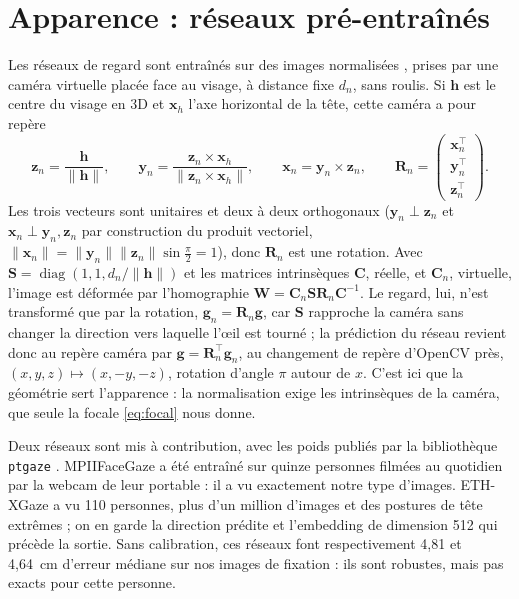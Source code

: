 \documentclass[10pt,a4paper]{article}
\newcommand{\vect}[1]{\symbf{#1}}
\newcommand{\T}{^{\top}}
\begin{document}
\section{Apparence : réseaux pré-entraînés}\label{sec:app}

Les réseaux de regard sont entraînés sur des images normalisées \cite{zhang2018revisiting}, prises par une caméra virtuelle placée face au visage, à distance fixe $d_n$, sans roulis. Si $\vect h$ est le centre du visage en 3D et $\vect x_h$ l'axe horizontal de la tête, cette caméra a pour repère
\begin{equation}
\vect z_n=\frac{\vect h}{\|\vect h\|},\qquad
\vect y_n=\frac{\vect z_n\times\vect x_h}{\|\vect z_n\times\vect x_h\|},\qquad
\vect x_n=\vect y_n\times\vect z_n,\qquad
\mathbf R_n=\begin{pmatrix}\vect x_n\T\\ \vect y_n\T\\ \vect z_n\T\end{pmatrix}.
\end{equation}
Les trois vecteurs sont unitaires et deux à deux orthogonaux ($\vect y_n\perp\vect z_n$ et $\vect x_n\perp\vect y_n,\vect z_n$ par construction du produit vectoriel, $\|\vect x_n\|=\|\vect y_n\|\|\vect z_n\|\sin\frac\pi2=1$), donc $\mathbf R_n$ est une rotation. Avec $\mathbf S=\operatorname{diag}(1,1,d_n/\|\vect h\|)$ et les matrices intrinsèques $\mathbf C$, réelle, et $\mathbf C_n$, virtuelle, l'image est déformée par l'homographie $\mathbf W=\mathbf C_n\mathbf S\mathbf R_n\mathbf C^{-1}$. Le regard, lui, n'est transformé que par la rotation, $\vect g_n=\mathbf R_n\vect g$, car $\mathbf S$ rapproche la caméra sans changer la direction vers laquelle l'œil est tourné ; la prédiction du réseau revient donc au repère caméra par $\vect g=\mathbf R_n\T\vect g_n$, au changement de repère d'OpenCV près, $(x,y,z)\mapsto(x,-y,-z)$, rotation d'angle $\pi$ autour de $x$. C'est ici que la géométrie sert l'apparence : la normalisation exige les intrinsèques de la caméra, que seule la focale \eqref{eq:focal} nous donne.

Deux réseaux sont mis à contribution, avec les poids publiés par la bibliothèque \texttt{ptgaze} \cite{hysts}. MPIIFaceGaze \cite{zhang2017mpiifacegaze} a été entraîné sur quinze personnes filmées au quotidien par la webcam de leur portable : il a vu exactement notre type d'images. ETH-XGaze \cite{zhang2020eth} a vu 110 personnes, plus d'un million d'images et des postures de tête extrêmes ; on en garde la direction prédite et l'embedding de dimension 512 qui précède la sortie. Sans calibration, ces réseaux font respectivement 4,81 et 4,64~cm d'erreur médiane sur nos images de fixation : ils sont robustes, mais pas exacts pour cette personne.
\end{document}
